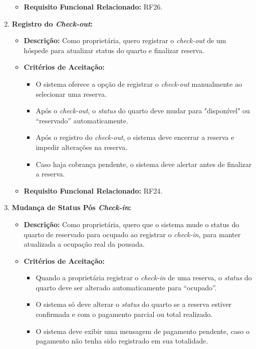 \documentclass[
	12pt,				%
	openany,			%
	twoside,			%
	a4paper,			%
	english,			%
	french,				%
	spanish,			%
	brazil				%
	]{abntex2}
\begin{document}
\begin{enumerate}[label=\textbf{\arabic*.}]
\begin{itemize}
\begin{itemize}
	 	\end{itemize}
	 	\item \textbf{Requisito Funcional Relacionado:} RF26.
	 \end{itemize} 
	  \item \textbf{Registro do \textit{Check-out}:}
	 \begin{itemize}
	 	\item \textbf{Descrição:}  Como proprietária, quero registrar o \textit{check-out} de um hóspede para atualizar status do quarto e finalizar reserva.
	 	\item \textbf{Critérios de Aceitação:}
	 	\begin{itemize}
	 		\item O sistema oferece a opção de registrar o \textit{check-out} manualmente ao selecionar uma reserva.
	 		\item Após o \textit{check-out}, o \textit{status} do quarto deve mudar para "disponível" ou “reservado” automaticamente.
	 		\item Após o registro do \textit{check-out}, o sistema deve encerrar a reserva e impedir alterações na reserva.
	 		\item Caso haja cobrança pendente, o sistema deve alertar antes de finalizar a reserva.
	 	\end{itemize}
	 	\item \textbf{Requisito Funcional Relacionado:} RF24.
	 \end{itemize} 
	  \item \textbf{Mudança de Status Pós \textit{Check-in}:}
	 \begin{itemize}
	 	\item \textbf{Descrição:} Como proprietária, quero que o sistema mude o status do quarto de reservado para ocupado ao registrar o \textit{check-in}, para manter atualizada a ocupação real da pousada.
	 	\item \textbf{Critérios de Aceitação:}
	 	\begin{itemize}
	 		\item Quando a proprietária registrar o \textit{check-in} de uma reserva, o \textit{status} do quarto deve ser alterado automaticamente para “ocupado”.
	 		\item O sistema só deve alterar o \textit{status} do quarto se a reserva estiver confirmada e com o pagamento parcial ou total realizado.
	 		\item O sistema deve exibir uma mensagem de pagamento pendente, caso o pagamento não tenha sido registrado em sua totalidade.

\end{itemize}
\end{itemize}
\end{enumerate}
\end{document}
